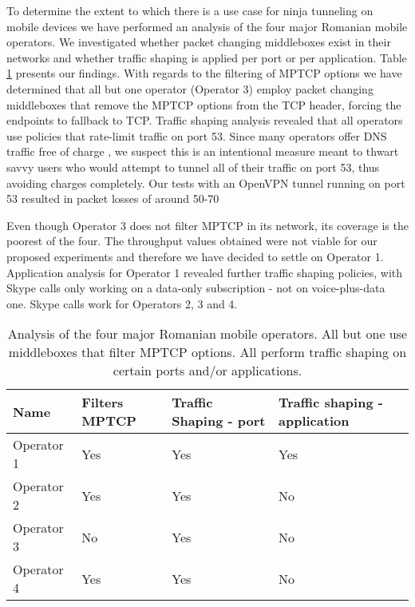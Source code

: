 
To determine the extent to which there is a use case for ninja tunneling on mobile devices we have performed an analysis of the four major Romanian mobile operators. We investigated whether packet changing middleboxes exist in their networks and whether traffic shaping is applied per port or per application. Table \ref{table:operators} presents our findings. With regards to the filtering of MPTCP options we have determined that all but one operator (Operator 3) employ packet changing middleboxes that remove the MPTCP options from the TCP header, forcing the endpoints to fallback to TCP. Traffic shaping analysis revealed that all operators use policies that rate-limit traffic on port 53. Since many operators offer DNS traffic free of charge \cite{freedns}, we suspect this is an intentional measure meant to thwart savvy users who would attempt to tunnel all of their traffic on port 53, thus avoiding charges completely. Our tests with an OpenVPN tunnel running on port 53 resulted in packet losses of around 50-70%

Even though Operator 3 does not filter MPTCP in its network, its coverage is the poorest of the four. The throughput values obtained were not viable for our proposed experiments and therefore we have decided to settle on Operator 1. Application analysis for Operator 1 revealed further traffic shaping policies, with Skype calls only working on a data-only subscription - not on voice-plus-data one. Skype calls work for Operators 2, 3 and 4.

\begin{center}
    \begin{table}
    \centering
    \begin{tabular}{ | l | l | l | l | }
    \hline
    Name & Filters MPTCP & Traffic Shaping - port & Traffic shaping - application \\ \hline
    Operator 1 & Yes & Yes & Yes  \\ \hline
    Operator 2 & Yes & Yes & No \\ \hline
    Operator 3 & No & Yes & No \\ \hline
    Operator 4 & Yes & Yes & No \\ \hline
    \end{tabular}
    \caption{Analysis of the four major Romanian mobile operators. All but one use middleboxes that filter MPTCP options. All perform traffic shaping on certain ports and/or applications. }
    \label{table:operators}
    \end{table}
\end{center}

